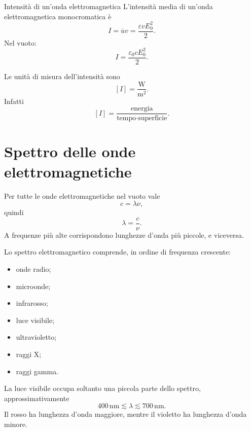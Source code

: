 \documentclass[a4paper]{article}
\begin{document}
\begin{snippettheorem}{Intensità di un'onda elettromagnetica}
L'intensità media di un'onda elettromagnetica monocromatica è
\[
    I=\overline{u}v=\frac{\varepsilon vE_0^2}{2}.
\]
Nel vuoto:
\[
    I=\frac{\varepsilon_0cE_0^2}{2}.
\]
\end{snippettheorem}

Le unità di misura dell'intensità sono
\[
[I]=\frac{\mathrm{W}}{\mathrm{m}^2}.
\]
Infatti
\[
[I]=\frac{\text{energia}}{\text{tempo}\cdot\text{superficie}}.
\]

\section{Spettro delle onde elettromagnetiche}

Per tutte le onde elettromagnetiche nel vuoto vale
\[
c=\lambda\nu,
\]
quindi
\[
\lambda=\frac{c}{\nu}.
\]
A frequenze più alte corrispondono lunghezze d'onda più piccole, e viceversa.

Lo spettro elettromagnetico comprende, in ordine di frequenza crescente:
\begin{itemize}
\item onde radio;
\item microonde;
\item infrarosso;
\item luce visibile;
\item ultravioletto;
\item raggi X;
\item raggi gamma.
\end{itemize}

La luce visibile occupa soltanto una piccola parte dello spettro, approssimativamente
\[
400\,\mathrm{nm}\lesssim \lambda \lesssim 700\,\mathrm{nm}.
\]
Il rosso ha lunghezza d'onda maggiore, mentre il violetto ha lunghezza d'onda minore.

\begin{center}
\end{center}
\end{document}
